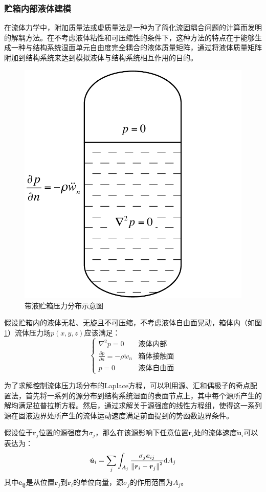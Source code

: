 \subsubsection{贮箱内部液体建模}
在流体力学中，附加质量法或虚质量法是一种为了简化流固耦合问题的计算而发明的解耦方法。在不考虑液体粘性和可压缩性的条件下，这种方法的特点在于能够生成一种与结构系统湿面单元自由度完全耦合的液体质量矩阵，通过将液体质量矩阵附加到结构系统来达到模拟液体与结构系统相互作用的目的。
\begin{figure}[!tb]
  \centering
  \includegraphics[width=.5\linewidth]{General-Liquid-Tank.pdf}
  \caption{带液贮箱压力分布示意图}\label{General-Liquid-Tank}
\end{figure}

假设贮箱内的液体无粘、无旋且不可压缩，不考虑液体自由面晃动，箱体内（如图\ref{General-Liquid-Tank}）流体压力场$p(x,y,z)$应该满足：
\begin{equation}
	\label{eq:Liquid-Laplace-Equation}
	\begin{cases}
	\nabla^2p=0 & \text{液体内部}\\
	{\displaystyle \frac{\partial p}{\partial n}}=-\rho \ddot{w}_n & \text{箱体接触面} \\
	p=0 & \text{液体自由面}
	\end{cases}
\end{equation}

为了求解控制流体压力场分布的Laplace方程，可以利用源、汇和偶极子的奇点配置法\cite{Morand:1995, Ohayon:1995, Ohayon:2004}，首先将一系列的源分布到结构系统湿面的表面节点上，其中每个源所产生的解均满足拉普拉斯方程。然后，通过求解关于源强度的线性方程组，使得这一系列源在固液边界处所产生的流体运动速度满足前面提到的势函数边界条件。

假设位于$\boldsymbol{r}_j$位置的源强度为$\sigma_j$，那么在该源影响下任意位置$\boldsymbol{r}_i$处的流体速度$\dot{\boldsymbol{u}}_i$可以表达为：
\begin{equation}
	\label{eq:Laplace-Velocity-Holmholtz}
	\dot{\boldsymbol{u}}_i=\sum_j \int_{A_j} \frac{\sigma_j\boldsymbol{e}_{ij}}{{\| \boldsymbol{r}_i-\boldsymbol{r}_j \|}^2}\mathrm{d} A_j
\end{equation}
其中$\boldsymbol{e_{ij}}$是从位置$\boldsymbol{r}_j$到$\boldsymbol{r}_i$的单位向量，源$\sigma_j$的作用范围为$A_j$。

